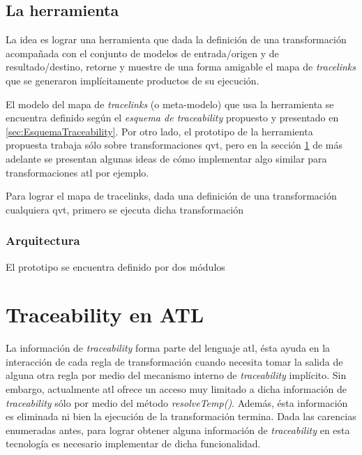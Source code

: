 \documentclass[a4paper,12pt,oneside,spanish]{book}
\begin{document}
\subsection{La herramienta}

La idea es lograr una herramienta que dada la definición de una transformación acompañada con el conjunto de modelos de entrada/origen y de resultado/destino, retorne y muestre de una forma amigable el mapa de \textit{tracelinks} que se generaron implícitamente productos de su ejecución. 

El modelo del mapa de \textit{tracelinks} (o meta-modelo) que usa la herramienta se encuentra definido según el \textit{esquema de traceability} propuesto y presentado en \ref{sec:EsquemaTraceability}. Por otro lado, el prototipo de la herramienta propuesta trabaja sólo sobre transformaciones \gls{qvt}, pero en la sección \ref{sec:ATLTtraceability} de más adelante se presentan algunas ideas de cómo implementar algo similar para transformaciones \gls{atl} por ejemplo.

Para lograr el mapa de tracelinks, dada una definición de una transformación cualquiera \gls{qvt}, primero se ejecuta dicha transformación 



\subsubsection{Arquitectura}


El prototipo se encuentra definido por dos módulos


\section{Traceability en ATL}
\label{sec:ATLTtraceability}

La información de \textit{traceability} forma parte del lenguaje \gls{atl}, ésta ayuda en la interacción de cada regla de transformación cuando necesita tomar la salida de alguna otra regla por medio del mecanismo interno de \textit{traceability} implícito. Sin embargo, actualmente \gls{atl} ofrece un acceso muy limitado a dicha información de \textit{traceability} sólo por medio del método \textsf{\textit{resolveTemp()}}. Además, ésta información es eliminada ni bien la ejecución de la transformación termina. Dada las carencias enumeradas antes, para lograr obtener alguna información de \textit{traceability} en esta tecnología es necesario implementar de dicha funcionalidad.
\end{document}

